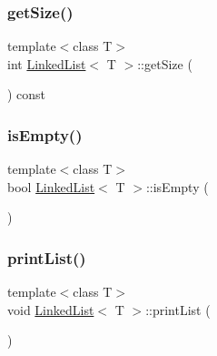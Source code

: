 \mbox{\label{class_linked_list_a2b77410d908509ee9f11497ead71a282}} 
\subsubsection{\texorpdfstring{get\+Size()}{getSize()}}
{\footnotesize\ttfamily template$<$class T$>$ \\
int \mbox{\hyperlink{class_linked_list}{Linked\+List}}$<$ T $>$\+::get\+Size (\begin{DoxyParamCaption}{ }\end{DoxyParamCaption}) const\hspace{0.3cm}{\ttfamily [inline]}}

\mbox{\label{class_linked_list_a7ecbb28e82117a680839ed0dc28ebdce}} 
\subsubsection{\texorpdfstring{is\+Empty()}{isEmpty()}}
{\footnotesize\ttfamily template$<$class T$>$ \\
bool \mbox{\hyperlink{class_linked_list}{Linked\+List}}$<$ T $>$\+::is\+Empty (\begin{DoxyParamCaption}{ }\end{DoxyParamCaption})\hspace{0.3cm}{\ttfamily [inline]}}

\mbox{\label{class_linked_list_af360d4c51f63b7756ac555efbfd5d4b6}} 
\subsubsection{\texorpdfstring{print\+List()}{printList()}}
{\footnotesize\ttfamily template$<$class T$>$ \\
void \mbox{\hyperlink{class_linked_list}{Linked\+List}}$<$ T $>$\+::print\+List (\begin{DoxyParamCaption}{ }\end{DoxyParamCaption})\hspace{0.3cm}{\ttfamily [inline]}}

